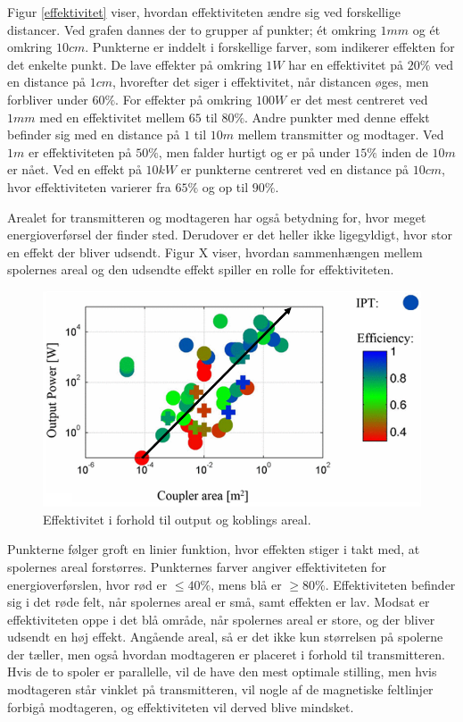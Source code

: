 Figur \ref{effektivitet} viser, hvordan effektiviteten ændre sig ved forskellige distancer. Ved grafen dannes der to grupper af punkter; ét omkring $1mm$ og ét omkring $10cm$. Punkterne er inddelt i forskellige farver, som indikerer effekten for det enkelte punkt. De lave effekter på omkring $1W$ har en effektivitet på $20\%$ ved en distance på $1cm$, hvorefter det siger i effektivitet, når distancen øges, men forbliver under $60\%$. For effekter på omkring $100W$ er det mest centreret ved $1mm$ med en effektivitet mellem $65$ til $80\%$. Andre punkter med denne effekt befinder sig med en distance på $1$ til $10m$ mellem transmitter og modtager. Ved $1m$ er effektiviteten på $50\%$, men falder hurtigt og er på under $15\%$ inden de $10m$ er nået. Ved en effekt på $10kW$ er punkterne centreret ved en distance på $10cm$, hvor effektiviteten varierer fra $65\%$ og op til $90\%$. \cite{limit}

Arealet for transmitteren og modtageren har også betydning for, hvor meget energioverførsel der finder sted. Derudover er det heller ikke ligegyldigt, hvor stor en effekt der bliver udsendt. Figur X viser, hvordan sammenhængen mellem spolernes areal og den udsendte effekt spiller en rolle for effektiviteten.

\begin{figure}[H]
\centering
\includegraphics[scale=0.5]{Vildledning/Schematics/Power_vs_coupler-area.png}
\caption{Effektivitet i forhold til output og koblings areal. \cite{limit}}
\end{figure}

Punkterne følger groft en linier funktion, hvor effekten stiger i takt med, at spolernes areal forstørres. Punkternes farver angiver effektiviteten for energioverførslen, hvor rød er $\leq 40\%$, mens blå er $\geq 80\%$. Effektiviteten befinder sig i det røde felt, når spolernes areal er små, samt effekten er lav. Modsat er effektiviteten oppe i det blå område, når spolernes areal er store, og der bliver udsendt en høj effekt. Angående areal, så er det ikke kun størrelsen på spolerne der tæller, men også hvordan modtageren er placeret i forhold til transmitteren. Hvis de to spoler er parallelle, vil de have den mest optimale stilling, men hvis modtageren står vinklet på transmitteren, vil nogle af de magnetiske feltlinjer forbigå modtageren, og effektiviteten vil derved blive mindsket.


